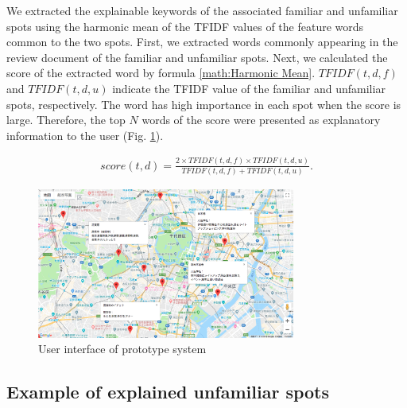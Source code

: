 \documentclass[journal]{IAENGtran}
\begin{document}
We extracted the explainable keywords of the associated familiar and unfamiliar spots using the harmonic mean of the TFIDF values of the feature words common to the two spots.
First, we extracted words commonly appearing in the review document of the familiar and unfamiliar spots.
Next, we calculated the score of the extracted word by formula \ref{math:Harmonic Mean}. $TFIDF(t,d,f)$ and $TFIDF(t,d,u)$ indicate the TFIDF value of the familiar and unfamiliar spots, respectively.
The word has high importance in each spot when the score is large.
Therefore, the top $N$ words of the score were presented as explanatory information to the user (Fig. \ref{fig:Photo_Map}).

\begin{eqnarray}
  score(t,d) = \frac{2 \times TFIDF(t,d,f) \times TFIDF(t,d,u)}{TFIDF(t,d,f) + TFIDF(t,d,u)}.
  \label{math:Harmonic Mean}
\end{eqnarray}

\begin{figure}[t]
  \begin{center}
    \includegraphics[clip,width=8.5cm,bb=0 0 1289 750]{picture/Photo_Map.png}
    \caption{User interface of prototype system}
    \label{fig:Photo_Map}
   \end{center}
\end{figure}

\subsection{Example of explained unfamiliar spots}
\label{subsec:Example of explained unfamiliar spots}
\end{document}
